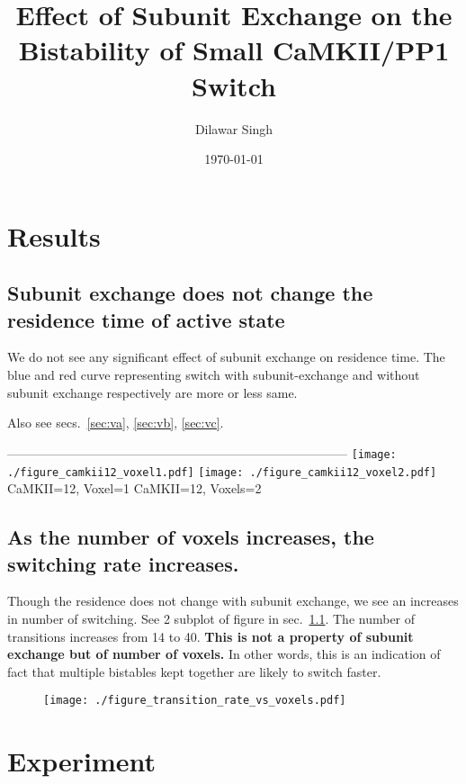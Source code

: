 \documentclass[]{article}
\title{Effect of Subunit Exchange on the Bistability of Small CaMKII/PP1 Switch}
\author{Dilawar Singh}
\institute{NCBS Bangalore}
\date{\today}
\begin{document}
\maketitle

\section{Results}\label{results}

\subsection{Subunit exchange does not change the residence time of
active state}\label{sec:res1}

We do not see any significant effect of subunit exchange on residence
time. The blue and red curve representing switch with subunit-exchange
and without subunit exchange respectively are more or less same.

Also see secs.~\ref{sec:va}, \ref{sec:vb}, \ref{sec:vc}.

---------------------------------------------\textbar{}------------------------------------
\texttt{[image: ./figure\_camkii12\_voxel1.pdf]}
\textbar{}
\texttt{[image: ./figure\_camkii12\_voxel2.pdf]}
CaMKII=12, Voxel=1 \textbar{} CaMKII=12, Voxels=2

\subsection{As the number of voxels increases, the switching rate
increases.}\label{as-the-number-of-voxels-increases-the-switching-rate-increases.}

Though the residence does not change with subunit exchange, we see an
increases in number of switching. See 2 subplot of figure in
sec.~\ref{sec:res1}. The number of transitions increases from 14 to 40.
\textbf{This is not a property of subunit exchange but of number of
voxels.} In other words, this is an indication of fact that multiple
bistables kept together are likely to switch faster.

\begin{figure}
\centering
\texttt{[image: ./figure\_transition\_rate\_vs\_voxels.pdf]}
\caption{}
\end{figure}

\newpage 

\hypertarget{sec:experiment}{\section{Experiment}\label{sec:experiment}}
\end{document}
